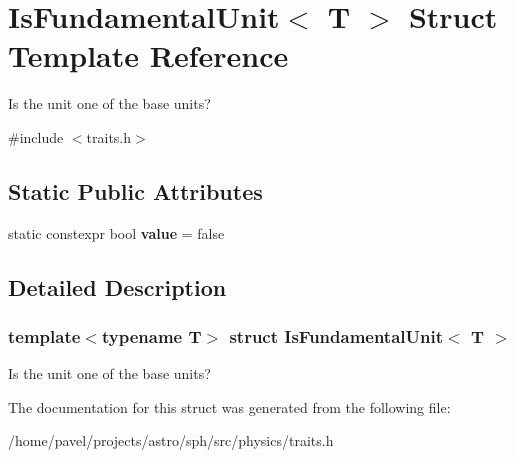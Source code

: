 \hypertarget{structIsFundamentalUnit}{}\section{Is\+Fundamental\+Unit$<$ T $>$ Struct Template Reference}
\label{structIsFundamentalUnit}


Is the unit one of the base units?  




{\ttfamily \#include $<$traits.\+h$>$}

\subsection*{Static Public Attributes}
\begin{DoxyCompactItemize}
\item 
\hypertarget{structIsFundamentalUnit_a017755ff53e8413e5cadc3ecdccf7b8d}{}\label{structIsFundamentalUnit_a017755ff53e8413e5cadc3ecdccf7b8d} 
static constexpr bool {\bfseries value} = false
\end{DoxyCompactItemize}


\subsection{Detailed Description}
\subsubsection*{template$<$typename T$>$\newline
struct Is\+Fundamental\+Unit$<$ T $>$}

Is the unit one of the base units? 

The documentation for this struct was generated from the following file\+:\begin{DoxyCompactItemize}
\item 
/home/pavel/projects/astro/sph/src/physics/traits.\+h\end{DoxyCompactItemize}
